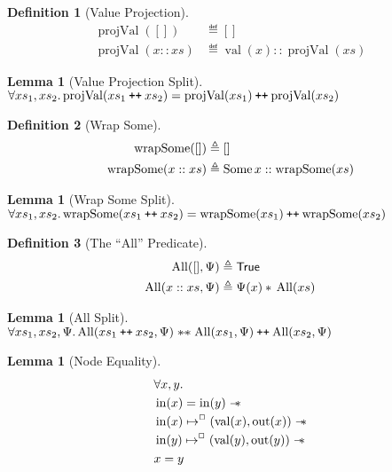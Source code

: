 \documentclass[a4paper, 10pt]{report}
\theoremstyle{definition}
\newtheorem{lemma}[theorem]{Lemma}
\newtheorem{definition}{Definition}[section]
\newcommand{\AllP}{\operatorname{All}}
\newcommand{\projval}{\operatorname{projVal}}
\newcommand{\wrapsome}{\operatorname{wrapSome}}
\newcommand{\nIn}[1]{\operatorname{in}(#1)}
\newcommand{\nVal}[1]{\operatorname{val}(#1)}
\newcommand{\nOut}[1]{\operatorname{out}(#1)}
\newcommand\catenate{\mathbin{\text{\ttfamily\upshape ++}}}
\newcommand{\isNode}[1]{\nIn{#1} \mapsto^{\persistently} (\nVal{#1}, \nOut{#1})}
\begin{document}
\begin{definition}[Value Projection]\label{COMMON:Def:val-proj}
  \begin{align*}
    \projval([]) &\eqdef []\\
    \projval(x :: xs) &\eqdef \nVal{x} :: \projval(xs)
  \end{align*}
\end{definition}

\begin{lemma}[Value Projection Split]\label{lemma:value-proj-split}
  $\All xs_1, xs_2.\\
  \projval(xs_1 \catenate xs_2) = \projval(xs_1) \catenate \projval(xs_2)$
\end{lemma}

\begin{definition}[Wrap Some]\label{COMMON:Def:wrap-some}
  \begin{align*}
    \wrapsome([]) &\eqdef []\\
    \wrapsome(x :: xs) &\eqdef \Some{x} :: \wrapsome(xs)
  \end{align*}
\end{definition}

\begin{lemma}[Wrap Some Split]\label{lemma:wrap-some-split}
  $\All xs_1, xs_2.\\
  \wrapsome(xs_1 \catenate xs_2) = \wrapsome(xs_1) \catenate \wrapsome(xs_2)$
\end{lemma}

\begin{definition}[The ``All'' Predicate]\label{COMMON:Def:All}
  \begin{align*}
    \AllP([], \Psi) &\eqdef \TRUE\\
    \AllP(x :: xs, \Psi) &\eqdef \Psi(x) \star{} \AllP(xs)
  \end{align*}
\end{definition}

\begin{lemma}[All Split]\label{lemma:all-split}
  $\All xs_1, xs_2, \Psi.\\
  \AllP(xs_1 \catenate xs_2, \Psi) \wandIff \AllP(xs_1, \Psi) \catenate \AllP(xs_2, \Psi)$
\end{lemma}

\begin{lemma}[Node Equality]\label{lemma:nIn-equal}
  \begin{align*}
    &\All x, y.\\
    &\nIn{x} = \nIn{y} \wand\\
    &\isNode{x} \wand\\
    &\isNode{y} \wand\\
    &x = y
  \end{align*}
\end{lemma}
\end{document}
